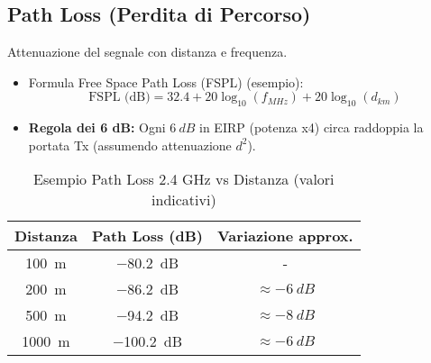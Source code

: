 \subsection{Path Loss (Perdita di Percorso)}
Attenuazione del segnale con distanza e frequenza.
\begin{itemize}
    \item Formula Free Space Path Loss (FSPL) (esempio):
    \[ \text{FSPL (dB)} = 32.4 + 20 \log_{10}(f_{MHz}) + 20 \log_{10}(d_{km}) \]
    \item \textbf{Regola dei 6 dB:} Ogni $\SI{+6}{dB}$ in EIRP (potenza x4) circa raddoppia la portata Tx (assumendo attenuazione $d^2$).
\end{itemize}
\begin{table}[H]
\centering
\caption{Esempio Path Loss 2.4 GHz vs Distanza (valori indicativi)}
\begin{tabular}{|c|c|c|}
\hline
\textbf{Distanza} & \textbf{Path Loss (dB)} & \textbf{Variazione approx.} \\ \hline
\SI{100}{\meter} & \SI{-80.2}{dB} & - \\ \hline
\SI{200}{\meter} & \SI{-86.2}{dB} & $\approx \SI{-6}{dB}$ \\ \hline
\SI{500}{\meter} & \SI{-94.2}{dB} & $\approx \SI{-8}{dB}$ \\ \hline
\SI{1000}{\meter} & \SI{-100.2}{dB} & $\approx \SI{-6}{dB}$ \\ \hline
\end{tabular}
\label{tab:path_loss}
\end{table}

